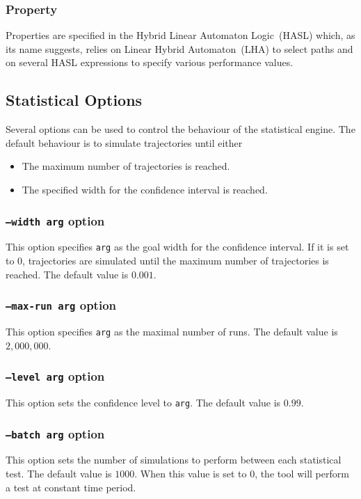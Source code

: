 \documentclass{article}
\begin{document}
\subsubsection{Property}
Properties are specified in the Hybrid Linear Automaton Logic~(HASL)
which, as its name suggests, relies on Linear Hybrid Automaton~(LHA) to
select paths and on several HASL expressions to specify various
performance values.


\subsection{Statistical Options}
Several options can be used to control the behaviour of the statistical engine.
The default behaviour is to simulate trajectories until either
\begin{itemize}
\item The maximum number of trajectories is reached.
\item The specified width for the confidence interval is reached.
\end{itemize}

\subsubsection{\texttt{--width arg}  option}
This option specifies \texttt{arg} as the goal width for the
confidence interval. If it is set to $0$, trajectories are simulated
until the maximum number of trajectories is reached.  The default
value is $0.001$.

\subsubsection{\texttt{--max-run arg}  option}
This option specifies \texttt{arg} as the maximal number of runs.
The default value is $2,000,000$.

\subsubsection{\texttt{--level arg}  option}
This option sets the confidence level to \texttt{arg}.
The default value is $0.99$.

\subsubsection{\texttt{--batch arg}  option}
This option sets the number of simulations to perform between each
statistical test.  The default value is $1000$. When this value is 
set to $0$, the tool will perform a test at constant time period.
\end{document}
